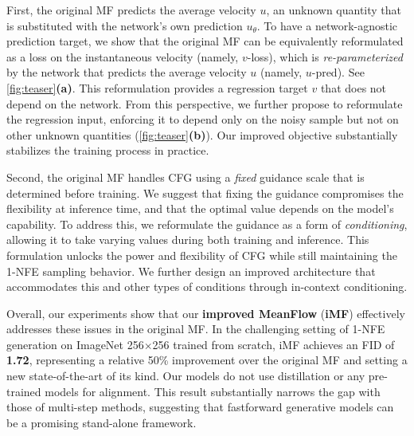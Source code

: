 First, the original MF predicts the average velocity $u$, an unknown quantity that is substituted with the network's own prediction $u_\theta$. To have a network-agnostic prediction target, we show that the original MF can be equivalently reformulated as a loss on the instantaneous velocity (namely, $v$-loss), which is \textit{re-parameterized} by the network that predicts the average velocity $u$ (namely, $u$-pred). See \cref{fig:teaser}\textbf{(a)}. 
This reformulation provides a regression target $v$ that does not depend on the network.
From this perspective, we further propose to reformulate the regression input, enforcing it to depend only on the noisy sample but not on other unknown quantities (\cref{fig:teaser}\textbf{(b)}). Our improved objective substantially stabilizes the training process in practice.

Second, the original MF handles CFG \cite{cfg} using a \textit{fixed} guidance scale that is determined before training. We suggest that fixing the guidance compromises the flexibility at inference time, and that the optimal value depends on the model’s capability. To address this, we reformulate the guidance as a form of \textit{conditioning}, allowing it to take varying values during both training and inference. This formulation unlocks the power and flexibility of CFG while still maintaining the 1-NFE sampling behavior.
We further design an improved architecture that accommodates this and other types of conditions through in-context conditioning.

Overall, our experiments show that our \textbf{improved MeanFlow} (\textbf{iMF}) effectively addresses these issues in the original MF. In the challenging setting of 1-NFE generation on ImageNet 256$\times$256 trained from scratch, iMF achieves an FID of \textbf{1.72}, representing a relative 50\% improvement over the original MF and setting a new state-of-the-art of its kind.
Our models do not use distillation or any pre-trained models for alignment. 
This result substantially narrows the gap with those of multi-step methods, suggesting that fastforward generative models can be a promising stand-alone framework.
